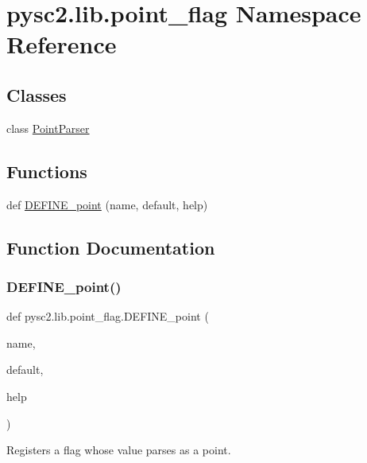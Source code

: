 \hypertarget{namespacepysc2_1_1lib_1_1point__flag}{}\section{pysc2.\+lib.\+point\+\_\+flag Namespace Reference}
\label{namespacepysc2_1_1lib_1_1point__flag}
\subsection*{Classes}
\begin{DoxyCompactItemize}
\item 
class \mbox{\hyperlink{classpysc2_1_1lib_1_1point__flag_1_1_point_parser}{Point\+Parser}}
\end{DoxyCompactItemize}
\subsection*{Functions}
\begin{DoxyCompactItemize}
\item 
def \mbox{\hyperlink{namespacepysc2_1_1lib_1_1point__flag_ae293d891e5c5f1884b5a7f2a9cdcb969}{D\+E\+F\+I\+N\+E\+\_\+point}} (name, default, help)
\end{DoxyCompactItemize}


\subsection{Function Documentation}
\mbox{\label{namespacepysc2_1_1lib_1_1point__flag_ae293d891e5c5f1884b5a7f2a9cdcb969}} 
\subsubsection{\texorpdfstring{D\+E\+F\+I\+N\+E\+\_\+point()}{DEFINE\_point()}}
{\footnotesize\ttfamily def pysc2.\+lib.\+point\+\_\+flag.\+D\+E\+F\+I\+N\+E\+\_\+point (\begin{DoxyParamCaption}\item[{}]{name,  }\item[{}]{default,  }\item[{}]{help }\end{DoxyParamCaption})}

\begin{DoxyVerb}Registers a flag whose value parses as a point.\end{DoxyVerb}
 